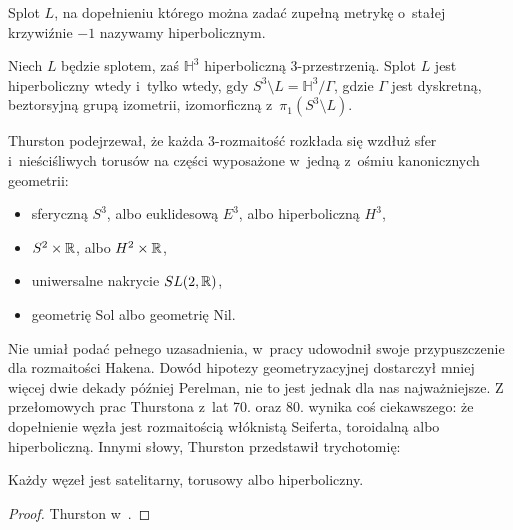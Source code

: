 \begin{definition}[hiperboliczny]
    Splot $L$, na dopełnieniu którego można zadać zupełną metrykę o~stałej krzywiźnie $-1$ nazywamy hiperbolicznym.
\end{definition}

\begin{proposition}
    Niech $L$ będzie splotem, zaś $\mathbb H^3$ hiperboliczną 3-przestrzenią.
    Splot $L$ jest hiperboliczny wtedy i~tylko wtedy, gdy $S^3 \setminus L = \mathbb H^3 / \Gamma$, gdzie $\Gamma$ jest dyskretną, beztorsyjną grupą izometrii, izomorficzną z~$\pi_1(S^3 \setminus L)$.
\end{proposition}

Thurston podejrzewał, że każda 3-rozmaitość rozkłada się wzdłuż sfer i~nieściśliwych torusów na części wyposażone w~jedną z~ośmiu kanonicznych geometrii:
\begin{itemize}
\item sferyczną $S^3$, albo euklidesową $E^3$, albo hiperboliczną $H^3$,
\item $S^2 \times \mathbb R$, albo $H^2 \times \mathbb R$,
\item uniwersalne nakrycie $SL(2, \mathbb R)$,
\item geometrię Sol albo geometrię Nil.
\end{itemize}
Nie umiał podać pełnego uzasadnienia, w~pracy \cite{thurston82} udowodnił swoje przypuszczenie dla rozmaitości Hakena.
Dowód hipotezy geometryzacyjnej dostarczył mniej więcej dwie dekady później Perelman, nie to jest jednak dla nas najważniejsze.
Z przełomowych prac Thurstona z~lat 70. oraz 80. wynika coś ciekawszego: że dopełnienie węzła jest rozmaitością włóknistą Seiferta, toroidalną albo hiperboliczną.
Innymi słowy, Thurston przedstawił trychotomię:

\begin{theorem}
    Każdy węzeł jest satelitarny, torusowy albo hiperboliczny.
\end{theorem}

\begin{proof}
    Thurston w~\cite[wniosek 2.5]{thurston82}.
\end{proof}


